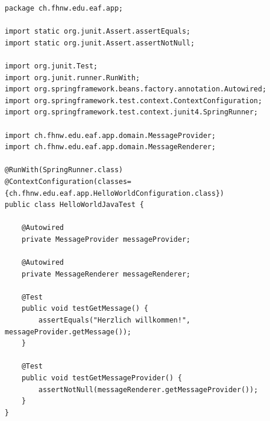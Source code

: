 \documentclass[a4paper,10pt]{scrreprt}
\begin{document}
\begin{lstlisting}[caption=HelloWorldJavaTest.java]
package ch.fhnw.edu.eaf.app;

import static org.junit.Assert.assertEquals;
import static org.junit.Assert.assertNotNull;

import org.junit.Test;
import org.junit.runner.RunWith;
import org.springframework.beans.factory.annotation.Autowired;
import org.springframework.test.context.ContextConfiguration;
import org.springframework.test.context.junit4.SpringRunner;

import ch.fhnw.edu.eaf.app.domain.MessageProvider;
import ch.fhnw.edu.eaf.app.domain.MessageRenderer;

@RunWith(SpringRunner.class)
@ContextConfiguration(classes= {ch.fhnw.edu.eaf.app.HelloWorldConfiguration.class})
public class HelloWorldJavaTest {
	
	@Autowired
	private MessageProvider messageProvider;
	
	@Autowired
	private MessageRenderer messageRenderer;
	
	@Test
	public void testGetMessage() {
		assertEquals("Herzlich willkommen!", messageProvider.getMessage());
	}

	@Test
	public void testGetMessageProvider() {
		assertNotNull(messageRenderer.getMessageProvider());
	}
}

\end{lstlisting}
\end{document}
